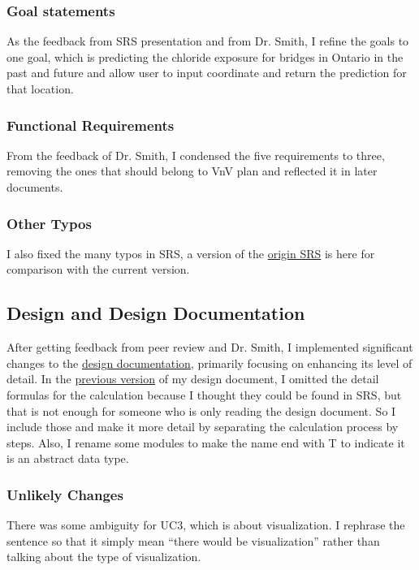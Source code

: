 \documentclass{article}
\begin{document}
\subsubsection{Goal statements}
As the feedback from SRS presentation and from Dr. Smith, I refine the goals to one goal, which is predicting the chloride exposure for bridges in Ontario in the past and future and allow user to input coordinate and return the prediction for that location.

\subsubsection{Functional Requirements}
From the feedback of Dr. Smith, I condensed the five requirements to three, removing the ones that should belong to VnV plan and reflected it in later documents.

\subsubsection{Other Typos}
I also fixed the many typos in SRS, a version of the \href{https://github.com/CynthiaLiu0805/BridgeCorrosion/blob/8e7dd3f2ec9c6140d6d36c7debbd7f42d1aaf747/docs/SRS/SRS.pdf}{origin SRS} is here for comparison with the current version.

\subsection{Design and Design Documentation}
After getting feedback from peer review and Dr. Smith, I implemented significant changes to the \href{https://github.com/CynthiaLiu0805/BridgeCorrosion/tree/main/docs/Design}{design documentation}, primarily focusing on enhancing its level of detail. In the \href{https://github.com/CynthiaLiu0805/BridgeCorrosion/tree/20b1a6d07956f6f319200b020e6b25e1b419a75f/docs/Design}{previous version} of my design document, I omitted the detail formulas for the calculation because I thought they could be found in SRS, but that is not enough for someone who is only reading the design document. So I include those and make it more detail by separating the calculation process by steps. Also, I rename some modules to make the name end with T to indicate it is an abstract data type.

\subsubsection{Unlikely Changes}
There was some ambiguity for UC3, which is about visualization. I rephrase the sentence so that it simply mean ``there would be visualization'' rather than talking about the type of visualization.
\end{document}

